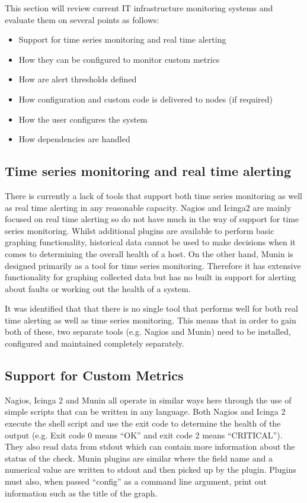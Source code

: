 \documentclass[bsc,logo,twoside,parskip,singlespacing,notimes]{infthesis}
\begin{document}
This section will review current IT infrastructure monitoring systems and
evaluate them on several points as follows:
\begin{itemize}
	\item Support for time series monitoring and real time alerting
	\item How they can be configured to monitor custom metrics
	\item How are alert thresholds defined
	\item How configuration and custom code is delivered to nodes (if required)
	\item How the user configures the system
	\item How dependencies are handled
\end{itemize}


\subsection{Time series monitoring and real time alerting}

	There is currently a lack of tools that support both
	time series monitoring as well as real time alerting in any reasonable capacity.
	Nagios and Icinga2 are mainly focused on real time alerting so do not have much
	in the way of support for time series monitoring.  Whilst additional plugins are
	available to perform basic graphing functionality, historical data
	cannot be used to make decisions when it comes to determining the overall
	health of a host. On the other hand, Munin is designed primarily as a tool for time
	series monitoring.  Therefore it has extensive functionality for graphing
	collected data but has no built in support for alerting about faults or working
	out the health of a system.


	It was identified that that there is no single tool that performs well for
	both real time alerting as well as time series monitoring.  This means that
	in order to gain both of these, two separate tools (e.g. Nagios and Munin)
	need to be installed, configured and maintained completely separately.

\subsection{Support for Custom Metrics}

	Nagios, Icinga 2 and Munin all operate in similar ways here through the use of
	simple scripts that can be written in any language.  Both Nagios and Icinga 2
	execute the shell script and use the exit code to determine the health of the
	output (e.g. Exit code 0 means ``OK'' and exit code 2 means ``CRITICAL'').  They
	also read data from stdout which can contain more information about the status
	of the check.  Munin plugins are similar where the field name and a numerical
	value are written to stdout and then picked up by the plugin.  Plugins must
	also, when passed ``config'' as a command line argument, print out information
	such as the title of the graph.
\end{document}
